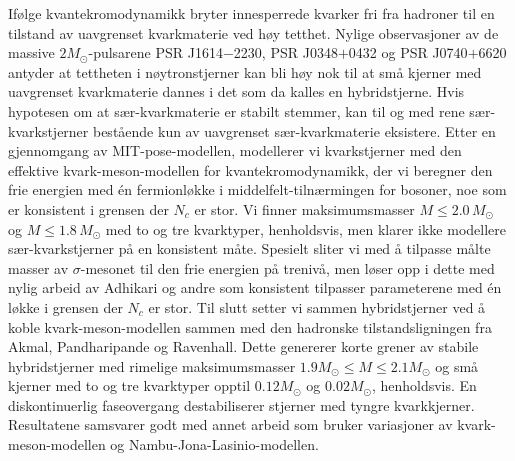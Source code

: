 Ifølge kvantekromodynamikk bryter innesperrede kvarker fri fra hadroner til en tilstand av uavgrenset kvarkmaterie ved høy tetthet.
Nylige observasjoner av de massive $2 M_\odot$-pulsarene PSR J1614$-$2230, PSR J0348$+$0432 og PSR J0740$+$6620
antyder at tettheten i nøytronstjerner kan bli høy nok til at små kjerner med uavgrenset kvarkmaterie
dannes i det som da kalles en hybridstjerne.
Hvis hypotesen om at sær-kvarkmaterie er stabilt stemmer,
kan til og med rene sær-kvarkstjerner bestående kun av uavgrenset sær-kvarkmaterie eksistere.
Etter en gjennomgang av MIT-pose-modellen,
modellerer vi kvarkstjerner med den effektive kvark-meson-modellen for kvantekromodynamikk,
der vi beregner den frie energien med én fermionløkke i middelfelt-tilnærmingen for bosoner, %
noe som er konsistent i grensen der $N_c$ er stor.
Vi finner maksimumsmasser $M \leq 2.0 \, M_\odot$ og $M \leq 1.8 \, M_\odot$ med
to og tre kvarktyper, henholdsvis,
men klarer ikke modellere sær-kvarkstjerner på en konsistent måte.
Spesielt sliter vi med å tilpasse målte masser av $\sigma$-mesonet til den frie energien på trenivå,
men løser opp i dette med nylig arbeid av Adhikari og andre
som konsistent tilpasser parameterene med én løkke i grensen der $N_c$ er stor.
Til slutt setter vi sammen hybridstjerner ved å koble kvark-meson-modellen
sammen med den hadronske tilstandsligningen fra Akmal, Pandharipande og Ravenhall.
Dette genererer korte grener av stabile hybridstjerner med rimelige maksimumsmasser $1.9 M_\odot \leq M \leq 2.1 M_\odot$
og små kjerner med to og tre kvarktyper opptil $0.12 M_\odot$ og $0.02 M_\odot$, henholdsvis.
En diskontinuerlig faseovergang destabiliserer stjerner med tyngre kvarkkjerner.
Resultatene samsvarer godt med annet arbeid
som bruker variasjoner av kvark-meson-modellen
og Nambu-Jona-Lasinio-modellen.%
\tikzexternaldisable%
%
\tikzexternalenable%
